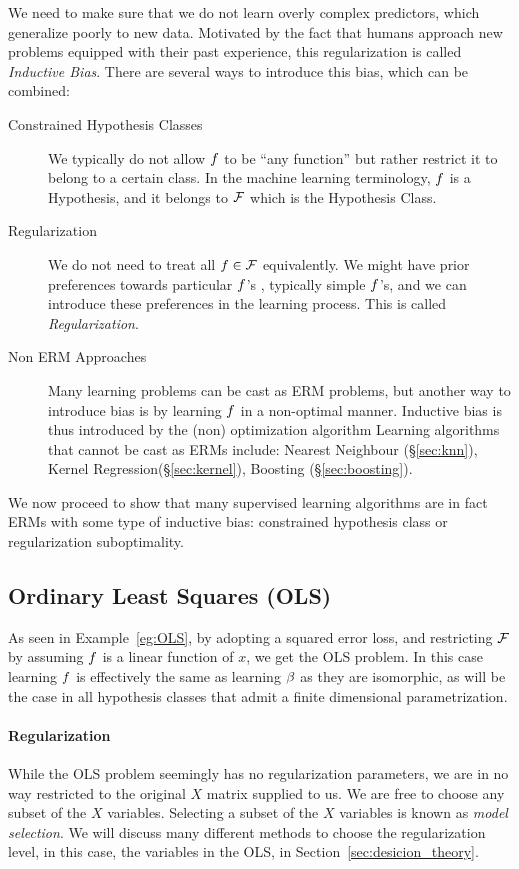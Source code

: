 We need to make sure that we do not learn overly complex predictors, which generalize poorly to new data.
Motivated by the fact that humans approach new problems equipped with their past experience, this regularization is called \emph{Inductive Bias}. 
There are several ways to introduce this bias, which can be combined:
\begin{description}
\item[Constrained Hypothesis Classes]
We typically do not allow $f$ to be ``any function'' but rather restrict it to belong to a certain class. In the machine learning terminology, $f$ is a Hypothesis, and it belongs to $\mathcal{F}$ which is the Hypothesis Class.
\item[Regularization] We do not need to treat all $f \in \mathcal{F}$ equivalently. We might have prior preferences towards particular $f$'s , typically simple $f$'s, and we can introduce these preferences in the learning process. This is called \emph{Regularization}.
\item[Non ERM Approaches] Many learning problems can be cast as ERM problems, but another way to introduce bias is by learning $f$ in a non-optimal manner. Inductive bias is thus introduced by the (non) optimization algorithm 
Learning algorithms that cannot be cast as ERMs include: Nearest Neighbour (\S\ref{sec:knn}), Kernel Regression(\S\ref{sec:kernel}), Boosting (\S\ref{sec:boosting}).
\end{description}

We now proceed to show that many supervised learning algorithms are in fact ERMs with some type of inductive bias: constrained hypothesis class \andor or regularization \andor suboptimality.

\subsection{Ordinary Least Squares (OLS)}
\label{sec:ols}
As seen in Example~\ref{eg:OLS}, by adopting a squared error loss, and restricting $\mathcal{F}$ by assuming $f$ is a linear function of $x$, we get the OLS problem.
In this case learning $f$ is effectively the same as learning $\beta$ as they are isomorphic, as will be the case in all hypothesis classes that admit a finite dimensional parametrization.

\paragraph{Regularization}
While the OLS problem seemingly has no regularization parameters, we are in no way restricted to the original $X$ matrix supplied to us. 
We are free to choose any subset of the $X$ variables. Selecting a subset of the $X$ variables is known as \emph{model selection}.
We will discuss many different methods to choose the regularization level, in this case, the variables in the OLS, in Section~\ref{sec:desicion_theory}.

